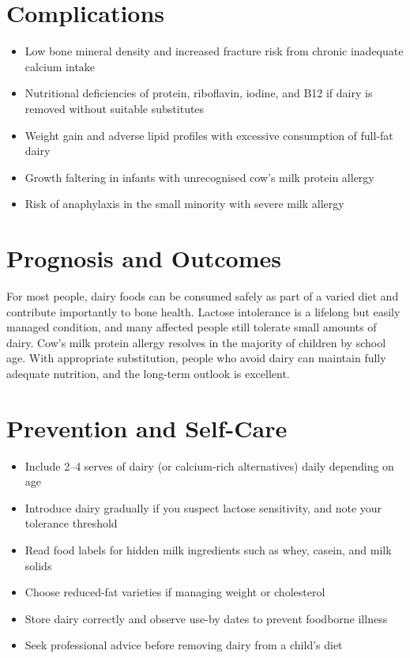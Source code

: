 \section*{Complications}
\begin{itemize}
    \item Low bone mineral density and increased fracture risk from chronic inadequate calcium intake
    \item Nutritional deficiencies of protein, riboflavin, iodine, and B12 if dairy is removed without suitable substitutes
    \item Weight gain and adverse lipid profiles with excessive consumption of full-fat dairy
    \item Growth faltering in infants with unrecognised cow's milk protein allergy
    \item Risk of anaphylaxis in the small minority with severe milk allergy
\end{itemize}

\section*{Prognosis and Outcomes}
For most people, dairy foods can be consumed safely as part of a varied diet and contribute importantly to bone health. Lactose intolerance is a lifelong but easily managed condition, and many affected people still tolerate small amounts of dairy. Cow's milk protein allergy resolves in the majority of children by school age. With appropriate substitution, people who avoid dairy can maintain fully adequate nutrition, and the long-term outlook is excellent.

\section*{Prevention and Self-Care}
\begin{itemize}
    \item Include 2--4 serves of dairy (or calcium-rich alternatives) daily depending on age
    \item Introduce dairy gradually if you suspect lactose sensitivity, and note your tolerance threshold
    \item Read food labels for hidden milk ingredients such as whey, casein, and milk solids
    \item Choose reduced-fat varieties if managing weight or cholesterol
    \item Store dairy correctly and observe use-by dates to prevent foodborne illness
    \item Seek professional advice before removing dairy from a child's diet
\end{itemize}

